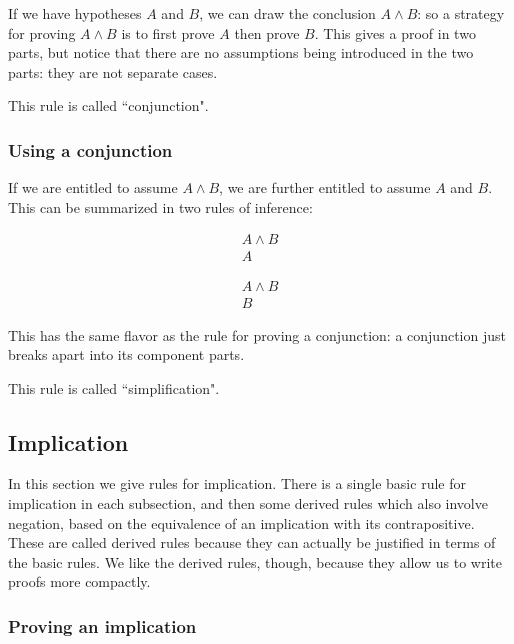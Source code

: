 \documentclass[12pt]{article}
\begin{document}
If we have hypotheses $A$ and $B$, we can draw the conclusion $A \wedge B$:  so a strategy for proving $A \wedge B$ is to first prove $A$ then prove $B$.  This gives a proof in two parts, but notice that there are no assumptions being introduced in the two parts:  they are not separate cases.

This rule is called ``conjunction".

\subsubsection{Using a conjunction}

If we are entitled to assume $A \wedge B$, we are further entitled to assume $A$ and $B$.  This can be summarized in two rules of inference:

$$\begin{array}{l} A \wedge B \\ \hline A \end{array}$$

$$\begin{array}{l} A \wedge B \\ \hline B \end{array}$$

This has the same flavor as the rule for proving a conjunction:  a conjunction just breaks apart into its component parts.

This rule is called ``simplification".

\subsection{Implication}

In this section we give rules for implication.  There is a single basic rule for implication in each subsection, and then some derived rules which also involve negation, based on the equivalence of an implication with its contrapositive.  These are called derived rules because they can actually be justified in terms of the basic rules.  We like the derived rules, though, because they allow us to write proofs more compactly.

\subsubsection{Proving an implication}
\end{document}
